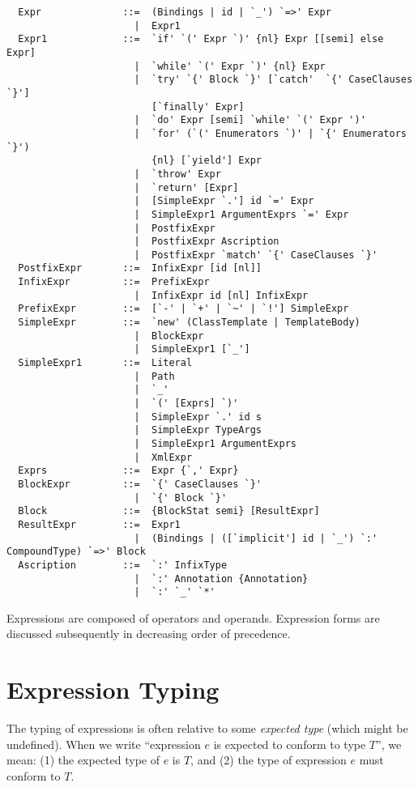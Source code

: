 \syntax\begin{lstlisting}
  Expr              ::=  (Bindings | id | `_') `=>' Expr
                      |  Expr1
  Expr1             ::=  `if' `(' Expr `)' {nl} Expr [[semi] else Expr]
                      |  `while' `(' Expr `)' {nl} Expr
                      |  `try' `{' Block `}' [`catch'  `{' CaseClauses `}'] 
                         [`finally' Expr]
                      |  `do' Expr [semi] `while' `(' Expr ')'
                      |  `for' (`(' Enumerators `)' | `{' Enumerators `}') 
                         {nl} [`yield'] Expr
                      |  `throw' Expr
                      |  `return' [Expr]
                      |  [SimpleExpr `.'] id `=' Expr
                      |  SimpleExpr1 ArgumentExprs `=' Expr
                      |  PostfixExpr
                      |  PostfixExpr Ascription
                      |  PostfixExpr `match' `{' CaseClauses `}'
  PostfixExpr       ::=  InfixExpr [id [nl]]
  InfixExpr         ::=  PrefixExpr
                      |  InfixExpr id [nl] InfixExpr
  PrefixExpr        ::=  [`-' | `+' | `~' | `!'] SimpleExpr 
  SimpleExpr        ::=  `new' (ClassTemplate | TemplateBody)
                      |  BlockExpr
                      |  SimpleExpr1 [`_']
  SimpleExpr1       ::=  Literal
                      |  Path
                      |  `_'
                      |  `(' [Exprs] `)'
                      |  SimpleExpr `.' id s
                      |  SimpleExpr TypeArgs
                      |  SimpleExpr1 ArgumentExprs
                      |  XmlExpr
  Exprs             ::=  Expr {`,' Expr}
  BlockExpr         ::=  `{' CaseClauses `}'
                      |  `{' Block `}'
  Block             ::=  {BlockStat semi} [ResultExpr]
  ResultExpr        ::=  Expr1
                      |  (Bindings | ([`implicit'] id | `_') `:' CompoundType) `=>' Block
  Ascription        ::=  `:' InfixType
                      |  `:' Annotation {Annotation} 
                      |  `:' `_' `*'
\end{lstlisting}

Expressions are composed of operators and operands. Expression forms are
discussed subsequently in decreasing order of precedence. 

\section{Expression Typing}\label{sec:expr-typing}

The typing of expressions is often relative to some {\em expected
type} (which might be undefined).  
When we write ``expression $e$ is expected to conform to
type $T$'', we mean: (1) the expected type of $e$ is
$T$, and (2) the type of expression $e$ must conform to
$T$.

